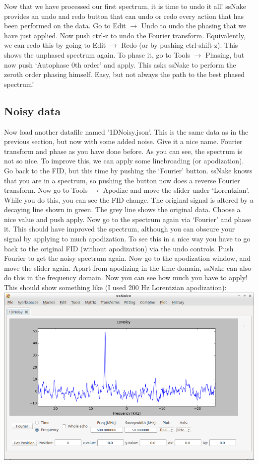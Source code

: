 \documentclass[11pt,a4paper]{article}
\begin{document}
Now that we have processed our first spectrum, it is time to undo it all! ssNake provides an undo and redo button that can undo or redo every action that has been performed on the data. Go to Edit $\rightarrow$ Undo to undo the phasing that we have just applied. Now push ctrl-z to undo the Fourier transform. Equivalently, we can redo this by going to Edit $\rightarrow$ Redo (or by pushing ctrl-shift-z). This shows the unphased spectrum again. To phase it, go to Tools $\rightarrow$ Phasing, but now push `Autophase 0th order' and apply. This asks ssNake to perform the zeroth order phasing himself. Easy, but not always the path to the best phased spectrum! 

\subsection{Noisy data}
Now load another datafile named '1DNoisy.json'. This is the same data as in the previous section, but now with some added noise. Give it a nice name. Fourier transform and phase as you have done before. As you can see, the spectrum is not so nice. To improve this, we can apply some linebroading (or apodization). Go back to the FID, but this time by pushing the `Fourier' button. ssNake knows that you are in a spectrum, so pushing the button now does a reverse Fourier transform. Now go to Tools $\rightarrow$ Apodize and move the slider under `Lorentzian'. While you do this, you can see the FID change. The original signal is altered by a decaying line shown in green. The grey line shows the original data. Choose a nice value and push apply. Now go to the spectrum again via `Fourier' and phase it. This should have improved the spectrum, although you can obscure your signal by applying to much apodization. To see this in a nice way you have to go back to the original FID (without apodization) via the undo controls. Push Fourier to get the noisy spectrum again. Now go to the apodization window, and move the slider again. Apart from apodizing in the time domain, ssNake can also do this in the frequency domain. Now you can see how much you have to apply! This should show something like (I used 200 Hz Lorentzian apodization):\\
\includegraphics[width=\linewidth]{Images/1DnoisyProcessed.png}
\end{document}

